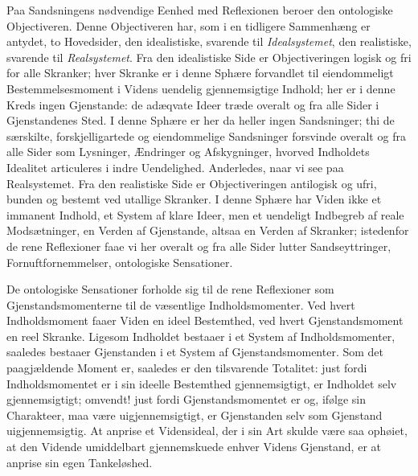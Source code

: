\documentclass[12pt]{book}
\newcommand{\opage}[1]{\marginnote{\footnotesize\textit{[#1]}}}
\begin{document}
Paa Sandsningens nødvendige Eenhed med Reflexionen beroer den ontologiske Objectiveren. Denne
Objectiveren har, som i en tidligere Sammenhæng er antydet, to Hovedsider, den idealistiske, svarende
til \emph{Idealsystemet}, den realistiske, svarende til \emph{Realsystemet}. Fra den idealistiske Side
er Objectiveringen logisk og fri for alle Skranker; hver Skranke er i denne Sphære forvandlet til
eiendommeligt Bestemmelsesmoment i Videns uendelig gjennemsigtige Indhold; her er i denne Kreds ingen
Gjenstande: de adæqvate Ideer træde overalt og fra alle Sider i Gjenstandenes Sted. I denne Sphære er
her da heller ingen Sandsninger; thi de særskilte, forskjelligartede og eiendommelige Sandsninger
forsvinde overalt og fra alle Sider som Lysninger, Ændringer og Afskygninger, hvorved Indholdets
Idealitet articuleres i indre Uendelighed. Anderledes, naar vi see paa Realsystemet. Fra den
realistiske Side er Objectiveringen antilogisk og ufri, bunden og bestemt ved utallige Skranker. I
denne Sphære har Viden ikke et immanent Indhold, et System af klare Ideer, men et uendeligt Indbegreb
af reale Modsætninger, en Verden af Gjenstande, altsaa en Verden af Skranker; istedenfor de rene
Reflexioner faae vi her overalt og fra alle Sider lutter Sandseyttringer, Fornuftfornemmelser,
ontologiske Sensationer.

De ontologiske Sensationer forholde sig til de rene Reflexioner som Gjenstandsmomenterne til de
væsentlige Indholdsmomenter. Ved hvert Indholdsmoment faaer Viden en ideel Bestemthed, ved hvert
Gjenstandsmoment en reel Skranke. Ligesom Indholdet bestaaer i et System af
\opage{261} Indholdsmomenter, saaledes bestaaer Gjenstanden i et System af Gjenstandsmomenter. Som det
paagjældende Moment er, saaledes er den tilsvarende Totalitet: just fordi Indholdsmomentet er i sin
ideelle Bestemthed gjennemsigtigt, er Indholdet selv gjennemsigtigt; omvendt! just fordi
Gjenstandsmomentet er og, ifølge sin Charakteer, maa være uigjennemsigtigt, er Gjenstanden selv som
Gjenstand uigjennemsigtig. At anprise et Vidensideal, der i sin Art skulde være saa ophøiet, at den
Vidende umiddelbart gjennemskuede enhver Videns Gjenstand, er at anprise sin egen Tankeløshed.
\end{document}
